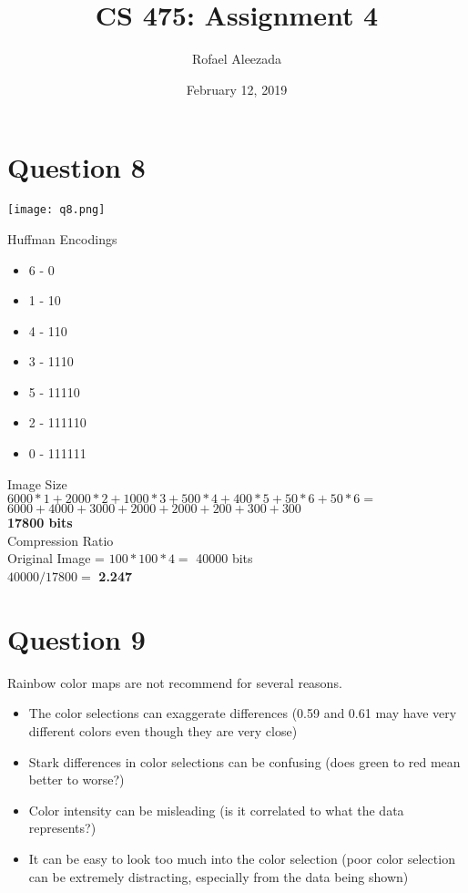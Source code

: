 \documentclass{article}
\title{CS 475: Assignment 4}
\date{February 12, 2019}
\author{Rofael Aleezada}
\begin{document}
	\maketitle
	
	\section{Question 8}
		\begin{center}
			\texttt{[image: q8.png]}
		\end{center}
		Huffman Encodings
		\begin{itemize}
			\item 6 - 0
			\item 1 - 10
			\item 4 - 110
			\item 3 - 1110
			\item 5 - 11110
			\item 2 - 111110
			\item 0 - 111111
		\end{itemize}
		Image Size \\
		\indent ${6000 * 1 + 2000 * 2 + 1000 * 3 + 500 * 4 + 400 * 5 + 50 * 6 + 50 * 6 = }$ \\
		\indent ${6000 + 4000 + 3000 + 2000 + 2000 + 200 + 300 + 300}$ \\
		\indent \textbf{17800 bits} \\
		Compression Ratio \\
		\indent Original Image = ${100 * 100 * 4 = }$ 40000 bits \\
		\indent ${40000 / 17800 = }$ \textbf{2.247}
		
	\section{Question 9}
		Rainbow color maps are not recommend for several reasons.
		\begin{itemize}
			\item The color selections can exaggerate differences (0.59 and 0.61 may have very different colors even though they are very close)
			\item Stark differences in color selections can be confusing (does green to red mean better to worse?)
			\item Color intensity can be misleading (is it correlated to what the data represents?)
			\item It can be easy to look too much into the color selection (poor color selection can be extremely distracting, especially from the data being shown)
		\end{itemize}
		
\end{document}
